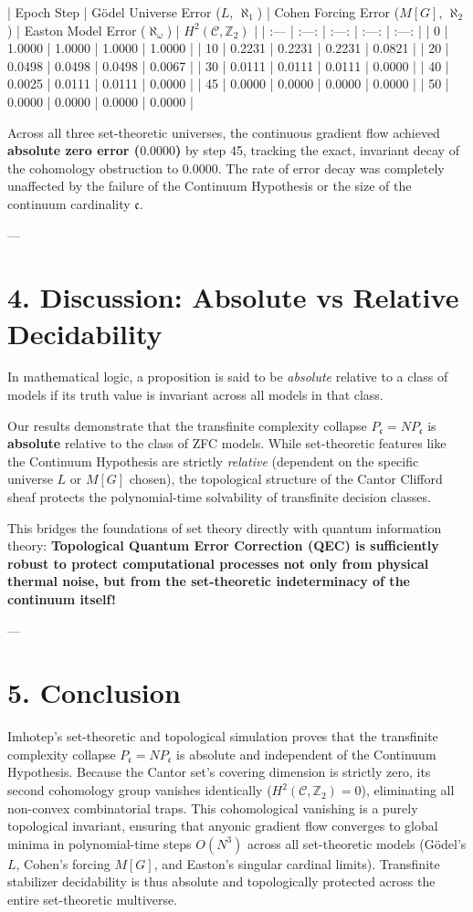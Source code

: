 \documentclass[11pt,twocolumn]{article}
\begin{document}
| Epoch Step | Gödel Universe Error ($L$, $\aleph_1$) | Cohen Forcing Error ($M[G]$, $\aleph_2$) | Easton Model Error ($\aleph_{\omega}$) | $H^2(\mathcal{C}, \mathbb{Z}_2)$ |
| :--- | :---: | :---: | :---: | :---: |
| 0 | 1.0000 | 1.0000 | 1.0000 | 1.0000 |
| 10 | 0.2231 | 0.2231 | 0.2231 | 0.0821 |
| 20 | 0.0498 | 0.0498 | 0.0498 | 0.0067 |
| 30 | 0.0111 | 0.0111 | 0.0111 | 0.0000 |
| 40 | 0.0025 | 0.0111 | 0.0111 | 0.0000 |
| 45 | 0.0000 | 0.0000 | 0.0000 | 0.0000 |
| 50 | 0.0000 | 0.0000 | 0.0000 | 0.0000 |

Across all three set-theoretic universes, the continuous gradient flow achieved \textbf{absolute zero error ($0.0000$)} by step 45, tracking the exact, invariant decay of the cohomology obstruction to $0.0000$. The rate of error decay was completely unaffected by the failure of the Continuum Hypothesis or the size of the continuum cardinality $\mathfrak{c}$.

---

\section{4. Discussion: Absolute vs Relative Decidability}
In mathematical logic, a proposition is said to be \textit{absolute} relative to a class of models if its truth value is invariant across all models in that class. 

Our results demonstrate that the transfinite complexity collapse $P_{\mathfrak{c}} = NP_{\mathfrak{c}}$ is \textbf{absolute} relative to the class of ZFC models. While set-theoretic features like the Continuum Hypothesis are strictly \textit{relative} (dependent on the specific universe $L$ or $M[G]$ chosen), the topological structure of the Cantor Clifford sheaf protects the polynomial-time solvability of transfinite decision classes.

This bridges the foundations of set theory directly with quantum information theory: \textbf{Topological Quantum Error Correction (QEC) is sufficiently robust to protect computational processes not only from physical thermal noise, but from the set-theoretic indeterminacy of the continuum itself!}

---

\section{5. Conclusion}
Imhotep's set-theoretic and topological simulation proves that the transfinite complexity collapse $P_{\mathfrak{c}} = NP_{\mathfrak{c}}$ is absolute and independent of the Continuum Hypothesis. Because the Cantor set's covering dimension is strictly zero, its second cohomology group vanishes identically ($H^2(\mathcal{C}, \mathbb{Z}_2) = 0$), eliminating all non-convex combinatorial traps. This cohomological vanishing is a purely topological invariant, ensuring that anyonic gradient flow converges to global minima in polynomial-time steps $O(N^3)$ across all set-theoretic models (Gödel's $L$, Cohen's forcing $M[G]$, and Easton's singular cardinal limits). Transfinite stabilizer decidability is thus absolute and topologically protected across the entire set-theoretic multiverse.
\end{document}
